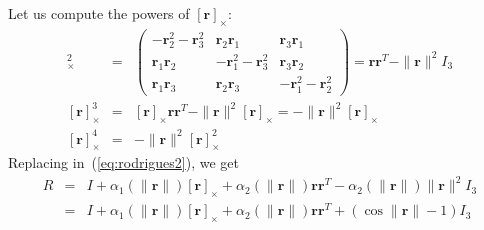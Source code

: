 \documentclass {article}
\newcommand\rot{\mathbf{r}}
\newcommand\rcross{[\rot]_{\times}}
\newcommand\normr{\|\rot\|}
\begin{document}
Let us compute the powers of $\rcross$:
\begin{eqnarray*}
\rcross^2 &=& \left(\begin{array}{ccc}
-\rot_2^2-\rot_3^2 & \rot_2\rot_1 & \rot_3\rot_1 \\
\rot_1\rot_2 & -\rot_1^2-\rot_3^2 & \rot_3\rot_2 \\
\rot_1\rot_3 & \rot_2\rot_3 & -\rot_1^2-\rot_2^2
\end{array}\right) =
\rot\rot^T - \normr^2 I_3\\
\rcross^3 &=& \rcross\rot\rot^T - \normr^2 \rcross = - \normr^2 \rcross\\
\rcross^4 &=& - \normr^2 \rcross^2
\end{eqnarray*}
Replacing in~(\ref{eq:rodrigues2}), we get
\begin{eqnarray}
R &=& I + \alpha_1 (\normr) \rcross + \alpha_2 (\normr) \rot\rot^T - \alpha_2 (\normr) \normr^2 I_3\\
\label{eq:rodrigues3}
&=&I + \alpha_1 (\normr) \rcross + \alpha_2 (\normr) \rot\rot^T + (\cos\normr-1) I_3
\end{eqnarray}
\end{document}
